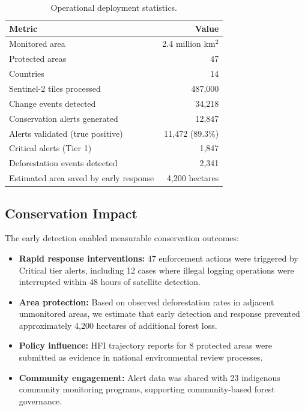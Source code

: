 \documentclass[11pt,a4paper]{article}
\begin{document}
\begin{table}[H]
\centering
\caption{Operational deployment statistics.}
\label{tab:operational}
\begin{tabular}{@{}lr@{}}
\toprule
\textbf{Metric} & \textbf{Value} \\
\midrule
Monitored area & 2.4 million km$^2$ \\
Protected areas & 47 \\
Countries & 14 \\
Sentinel-2 tiles processed & 487,000 \\
Change events detected & 34,218 \\
Conservation alerts generated & 12,847 \\
Alerts validated (true positive) & 11,472 (89.3\%) \\
Critical alerts (Tier 1) & 1,847 \\
Deforestation events detected & 2,341 \\
Estimated area saved by early response & 4,200 hectares \\
\bottomrule
\end{tabular}
\end{table}

\subsection{Conservation Impact}

The early detection enabled measurable conservation outcomes:

\begin{itemize}[leftmargin=*]
    \item \textbf{Rapid response interventions:} 47 enforcement actions were triggered by Critical tier alerts, including 12 cases where illegal logging operations were interrupted within 48 hours of satellite detection.
    \item \textbf{Area protection:} Based on observed deforestation rates in adjacent unmonitored areas, we estimate that early detection and response prevented approximately 4,200 hectares of additional forest loss.
    \item \textbf{Policy influence:} HFI trajectory reports for 8 protected areas were submitted as evidence in national environmental review processes.
    \item \textbf{Community engagement:} Alert data was shared with 23 indigenous community monitoring programs, supporting community-based forest governance.
\end{itemize}
\end{document}
